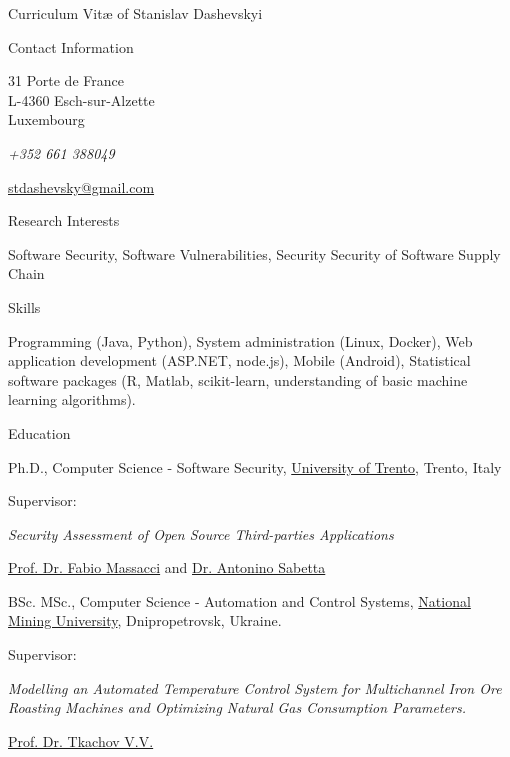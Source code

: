 \documentclass[11pt]{custom-style}
\providecommand*\email[1]{\href{mailto:#1}{#1}}
\begin{document}
\begin{cv}{Curriculum Vit\ae{} of Stanislav Dashevskyi}
  \begin{cvlist}{Contact Information}
    \item 31 Porte de France\\
        L-4360 Esch-sur-Alzette\\
        Luxembourg
    \item \textit{+352 661 388049}
      \item \email{stdashevsky@gmail.com}
  \end{cvlist}

  \begin{cvlist}{Research Interests}
  \item Software Security, Software Vulnerabilities, Security
    Security of Software Supply Chain
  \end{cvlist}

  \begin{cvlist}{Skills}
  \item Programming (Java, Python), System administration (Linux, Docker), Web application development (ASP.NET, node.js), Mobile (Android), Statistical software packages (R, Matlab, scikit-learn, understanding of basic machine learning algorithms).
  \end{cvlist}

  \begin{cvlist}{Education}
  \item[2017] Ph.D., Computer Science - Software Security,
    \href{http://www.unitn.it/en}{University of Trento}, Trento, Italy
    \begin{labeling}{Supervisor:}
    \item[Thesis:] \emph{Security Assessment of Open Source
        Third-parties Applications}
    \item[Supervisors:] \href{http://disi.unitn.it/~massacci/}
      {Prof. Dr. Fabio Massacci} and \href{https://www.sabetta.com/}
      {Dr. Antonino Sabetta}
    \end{labeling}
  \item[2010] BSc. MSc., Computer Science - Automation and Control
    Systems, \href{http://www.nmu.org.ua/en/}{National Mining
      University}, Dnipropetrovsk, Ukraine.
    \begin{labeling}{Supervisor:}
    \item[Thesis:] \emph{Modelling an Automated Temperature Control
        System for Multichannel Iron Ore Roasting Machines and
        Optimizing Natural Gas Consumption Parameters.}
    \item[Supervisor:]
      \href{http://aks.nmu.org.ua/en/Dep_ACS/Tkachev.php}
      {Prof. Dr. Tkachov V.V.}
    \end{labeling}
  \end{cvlist}


\end{cv}
\end{document}
